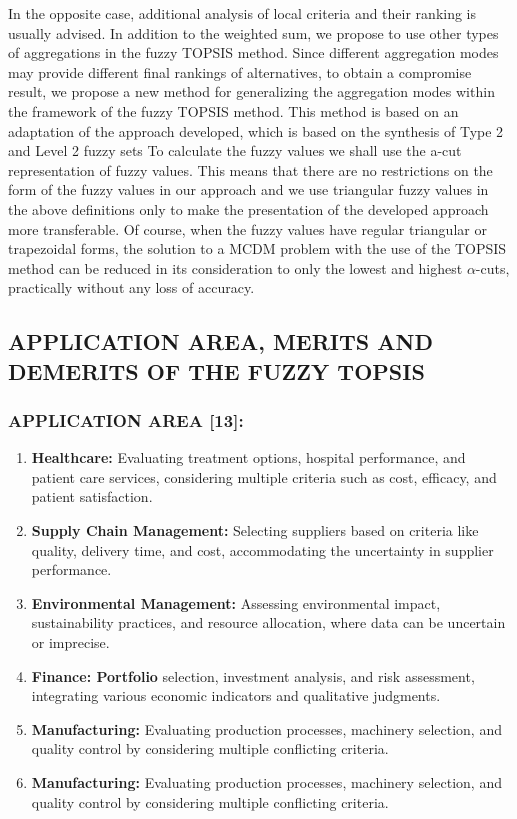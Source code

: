 \documentclass[12pt,a4paper]{article}
\begin{document}
In the opposite case, additional analysis of local criteria and their ranking is usually advised. In addition to the weighted sum, we propose to use other types of aggregations in the fuzzy TOPSIS method. Since different aggregation modes may provide different final rankings of alternatives, to obtain a compromise result, we propose a new method for generalizing the aggregation modes within the framework of the fuzzy TOPSIS method. This method is based on an adaptation of the approach developed, which is based on the synthesis of Type 2 and Level 2 fuzzy sets To calculate the fuzzy values we shall use the a-cut representation of fuzzy values. This means that there are no restrictions on the form of the fuzzy values in our approach and we use triangular fuzzy values in the above definitions only to make the presentation of the developed approach more transferable. Of course, when the fuzzy values have regular triangular or trapezoidal forms, the solution to a MCDM problem with the use of the TOPSIS method can be reduced in its consideration to only the lowest and highest $\alpha$-cuts, practically without any loss of accuracy.


\subsection{APPLICATION AREA, MERITS AND DEMERITS OF THE 
FUZZY TOPSIS}

\subsubsection*{APPLICATION AREA [13]:}
\begin{enumerate}
    \item \textbf{Healthcare:} Evaluating treatment options, hospital performance, and patient care services, considering multiple criteria such as cost, efficacy, and patient satisfaction.

    \item \textbf{Supply Chain Management:} Selecting suppliers based on criteria like quality, delivery time, and cost, accommodating the uncertainty in supplier performance.


    \item \textbf{Environmental Management:} Assessing environmental impact, sustainability practices, and resource allocation, where data can be uncertain or imprecise.


    \item \textbf{Finance: Portfolio} selection, investment analysis, and risk assessment, integrating various economic indicators and qualitative judgments.


    \item \textbf{Manufacturing:} Evaluating production processes, machinery selection, and quality control by considering multiple conflicting criteria.


    \item \textbf{Manufacturing:} Evaluating production processes, machinery selection, and quality control by considering multiple conflicting criteria.

\end{enumerate}
\end{document}
